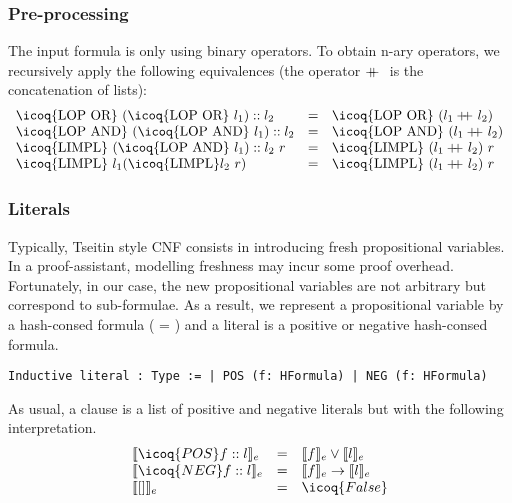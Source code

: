 \documentclass[utf8,a4paper,UKenglish,cleveref, autoref, thm-restate]{lipics-v2019}
\newcommand{\mcoq}[1]{\mbox{\icoq{#1}}}
\newcommand\doubleplus{+\kern-1.3ex+\kern0.8ex}
\begin{document}
\subsubsection{Pre-processing}
The input formula is only using binary operators.  To obtain n-ary
operators, we recursively apply the following equivalences (the
operator $\doubleplus$ is the concatenation of lists):
\[
  \begin{array}{lcl}
    \mcoq{LOP OR}\ (\mcoq{LOP OR}\ l_1):: l_2 &=& \mcoq{LOP OR}\ (l_1 \doubleplus l_2)\\
    \mcoq{LOP AND}\ (\mcoq{LOP AND}\ l_1):: l_2 &=& \mcoq{LOP AND}\ (l_1 \doubleplus l_2)\\
    \mcoq{LIMPL}\ (\mcoq{LOP AND}\ l_1):: l_2\  r  &=& \mcoq{LIMPL}\ (l_1 \doubleplus l_2)\ r\\
    \mcoq{LIMPL}\ l_1 (\mcoq{LIMPL} l_2\ r)  &=& \mcoq{LIMPL}\ (l_1 \doubleplus l_2)\ r\\
  \end{array}
\]

\subsubsection{Literals}
Typically, Tseitin style CNF consists in introducing fresh
propositional variables.  In a proof-assistant, modelling freshness
may incur some proof overhead. Fortunately, in our case, the new
propositional variables are not arbitrary but correspond to
sub-formulae. As a result, we represent a propositional variable by a
hash-consed formula ( = ) and a
literal is a positive or negative hash-consed formula.
\begin{verbatim}
Inductive literal : Type := | POS (f: HFormula) | NEG (f: HFormula)
\end{verbatim}
As usual, a clause is a list of positive and negative literals but with the following interpretation.
\[
  \begin{array}{lcl}
    \llbracket \icoq{POS} f :: l \rrbracket_e & = & \llbracket f \rrbracket_e \lor \llbracket l \rrbracket_e \\
    \llbracket \icoq{NEG} f :: l \rrbracket_e & = & \llbracket f \rrbracket_e \rightarrow \llbracket l \rrbracket_e \\
    \llbracket [] \rrbracket_e &= & \icoq{False} \\
  \end{array}
\]
\end{document}
